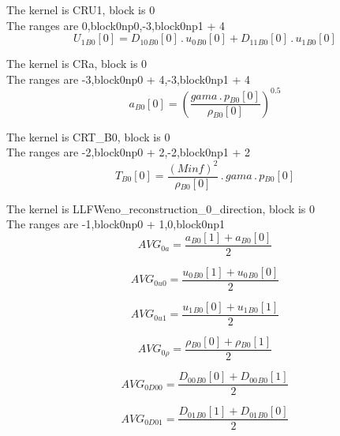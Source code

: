 \documentclass{article}
\begin{document}
\noindent The kernel is CRU1, block is 0\\\noindent The ranges are 0,block0np0,-3,block0np1 + 4\\\begin{dmath}{U_{1}{_{B0}}}[{0}] = {D_{10}{_{B0}}}[{0}] \,.\, {u_{0}{_{B0}}}[{0}] + {D_{11}{_{B0}}}[{0}] \,.\, {u_{1}{_{B0}}}[{0}]\end{dmath}

\noindent The kernel is CRa, block is 0\\\noindent The ranges are -3,block0np0 + 4,-3,block0np1 + 4\\\begin{dmath}{a{_{B0}}}[{0}] = \left(\frac{gama \,.\, {p{_{B0}}}[{0}]}{{\rho{_{B0}}}[{0}]} \right)^{0.5}\end{dmath}

\noindent The kernel is CRT_B0, block is 0\\\noindent The ranges are -2,block0np0 + 2,-2,block0np1 + 2\\\begin{dmath}{T{_{B0}}}[{0}] = \frac{\left(Minf \right)^{2}}{{\rho{_{B0}}}[{0}]} \,.\, gama \,.\, {p{_{B0}}}[{0}]\end{dmath}

\noindent The kernel is LLFWeno_reconstruction_0_direction, block is 0\\\noindent The ranges are -1,block0np0 + 1,0,block0np1\\\begin{dmath}AVG_{0 a} = \frac{{a{_{B0}}}[{1}] + {a{_{B0}}}[{0}]}{2}\end{dmath}

\begin{dmath}AVG_{0 u0} = \frac{{u_{0}{_{B0}}}[{1}] + {u_{0}{_{B0}}}[{0}]}{2}\end{dmath}

\begin{dmath}AVG_{0 u1} = \frac{{u_{1}{_{B0}}}[{0}] + {u_{1}{_{B0}}}[{1}]}{2}\end{dmath}

\begin{dmath}AVG_{0 \rho} = \frac{{\rho{_{B0}}}[{0}] + {\rho{_{B0}}}[{1}]}{2}\end{dmath}

\begin{dmath}AVG_{0 D00} = \frac{{D_{00}{_{B0}}}[{0}] + {D_{00}{_{B0}}}[{1}]}{2}\end{dmath}

\begin{dmath}AVG_{0 D01} = \frac{{D_{01}{_{B0}}}[{1}] + {D_{01}{_{B0}}}[{0}]}{2}\end{dmath}
\end{document}
